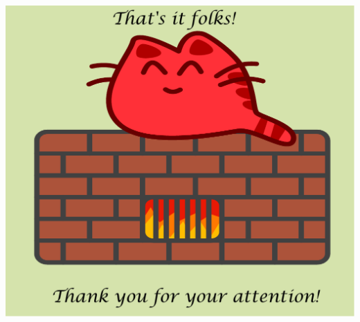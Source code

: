 \documentclass[xcolor=x11names,compress]{beamer}
\renewcommand{\(}{\begin{columns}}
\renewcommand{\)}{\end{columns}}
\newcommand{\<}[1]{\begin{column}{#1}}
\renewcommand{\>}{\end{column}}
\begin{document}
\begin{frame}

\begin{center}
\includegraphics[keepaspectratio, width=.8\textwidth]{happycat-end}
\end{center}
\end{frame}
\end{document}
